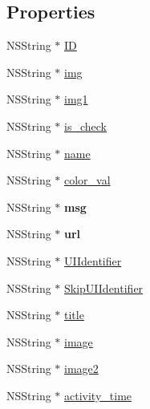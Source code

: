 \subsection*{Properties}
\begin{DoxyCompactItemize}
\item 
N\+S\+String $\ast$ \mbox{\hyperlink{interface_f_n_tab_model_ac5fac4c77f78fc71c8ac328041214f73}{ID}}
\item 
N\+S\+String $\ast$ \mbox{\hyperlink{interface_f_n_tab_model_a9c4ddd0bb928749dffd71769706576fc}{img}}
\item 
N\+S\+String $\ast$ \mbox{\hyperlink{interface_f_n_tab_model_a0273736f54598765b6639c82f8a09015}{img1}}
\item 
N\+S\+String $\ast$ \mbox{\hyperlink{interface_f_n_tab_model_a563efb70de3302033862211d8953780d}{is\+\_\+check}}
\item 
N\+S\+String $\ast$ \mbox{\hyperlink{interface_f_n_tab_model_a2732f9993fc8b38c905bcfd3d39a6f05}{name}}
\item 
N\+S\+String $\ast$ \mbox{\hyperlink{interface_f_n_tab_model_ad6e1f876448aa0e2662d1ee385983613}{color\+\_\+val}}
\item 
\mbox{\label{interface_f_n_tab_model_ae2197543efe13c80178f4ab27e2516ab}} 
N\+S\+String $\ast$ {\bfseries msg}
\item 
\mbox{\label{interface_f_n_tab_model_aba55aa37dc7306dc336c64954ecf5036}} 
N\+S\+String $\ast$ {\bfseries url}
\item 
N\+S\+String $\ast$ \mbox{\hyperlink{interface_f_n_tab_model_aa26fd056e8e87c3d54ee44a7b7822aa9}{U\+I\+Identifier}}
\item 
N\+S\+String $\ast$ \mbox{\hyperlink{interface_f_n_tab_model_a1dbe6ecee4635484dbcbd368ea3d86c2}{Skip\+U\+I\+Identifier}}
\item 
N\+S\+String $\ast$ \mbox{\hyperlink{interface_f_n_tab_model_ab7fd7a15927ab418dd42456c5954d596}{title}}
\item 
N\+S\+String $\ast$ \mbox{\hyperlink{interface_f_n_tab_model_a0788b5783829812866828a6dfaa26211}{image}}
\item 
N\+S\+String $\ast$ \mbox{\hyperlink{interface_f_n_tab_model_afae8fddeb27ad0390bff56dd9181f202}{image2}}
\item 
N\+S\+String $\ast$ \mbox{\hyperlink{interface_f_n_tab_model_abed859dc5eae88634b910fb1aac8368d}{activity\+\_\+time}}
\item 

\end{DoxyCompactItemize}
